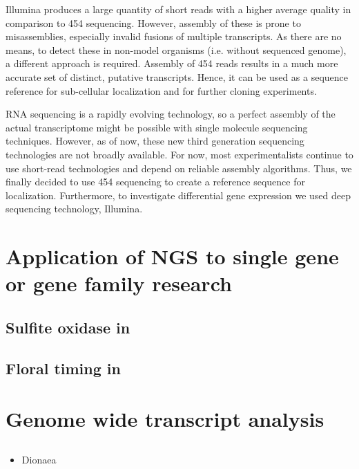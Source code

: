 		Illumina produces a large quantity of short reads with a higher average quality in comparison to 454 sequencing.
		However,  assembly of these is prone to misassemblies, especially invalid fusions of multiple transcripts.
		As there are no means, to detect these in non-model organisms (i.e. without sequenced genome), a different approach is required.
		Assembly of 454 reads results in a much more accurate set of distinct, putative transcripts.
		Hence, it can be used as a sequence reference for sub-cellular localization and for further cloning experiments.
		

		RNA sequencing is a rapidly evolving technology, so a perfect assembly of the actual transcriptome might be possible with single molecule sequencing techniques.
		However, as of now, these new third generation sequencing technologies are not broadly available.
		For now, most experimentalists continue to use short-read technologies and depend on reliable assembly algorithms.
		Thus, we finally decided to use 454 sequencing to create a reference sequence for  localization.
		Furthermore, to investigate differential gene expression we used deep sequencing technology, Illumina.
		
		
	
 \section{Application of NGS to single gene or gene family research}
 \subsection{Sulfite oxidase in }
 \subsection{Floral timing in }
 
 \section{Genome wide transcript analysis}
 \subsection{}
 \begin{itemize}
 	\item Dionaea
 \end{itemize}
